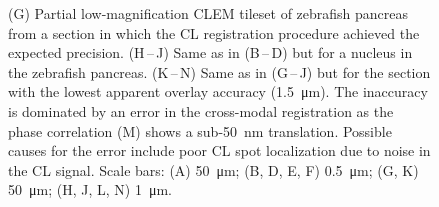 \addtocounter{figure}{-1}
\begin{figure}
    \caption{%
    (G) Partial low-magnification CLEM tileset of zebrafish pancreas from a section in which the CL registration procedure achieved the expected precision. (H\,--\,J) Same as in (B\,--\,D) but for a nucleus in the zebrafish pancreas. (K\,--\,N) Same as in (G\,--\,J) but for the section with the lowest apparent overlay accuracy (\SI{1.5}{\micro\meter}). The inaccuracy is dominated by an error in the cross-modal registration as the phase correlation (M) shows a sub-\SI{50}{\nano\meter} translation. Possible causes for the error include poor CL spot localization due to noise in the CL signal.
    Scale bars: (A) \SI{50}{\micro\meter}; (B, D, E, F) \SI{0.5}{\micro\meter}; (G, K) \SI{50}{\micro\meter}; (H, J, L, N) \SI{1}{\micro\meter}.}
\end{figure}

\quad
